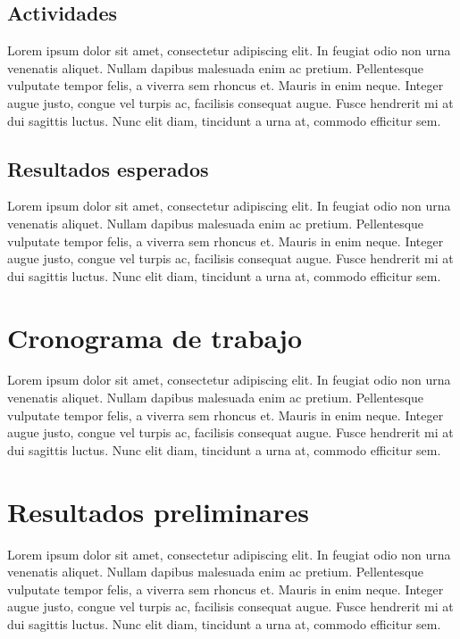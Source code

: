 \documentclass[letterpaper,twoside,10pt]{report}
\begin{document}
\section{Actividades}

Lorem ipsum dolor sit amet, consectetur adipiscing elit. In feugiat odio non urna venenatis aliquet. Nullam dapibus malesuada enim ac pretium. Pellentesque vulputate tempor felis, a viverra sem rhoncus et. Mauris in enim neque. Integer augue justo, congue vel turpis ac, facilisis consequat augue. Fusce hendrerit mi at dui sagittis luctus. Nunc elit diam, tincidunt a urna at, commodo efficitur sem.

\section{Resultados esperados}

Lorem ipsum dolor sit amet, consectetur adipiscing elit. In feugiat odio non urna venenatis aliquet. Nullam dapibus malesuada enim ac pretium. Pellentesque vulputate tempor felis, a viverra sem rhoncus et. Mauris in enim neque. Integer augue justo, congue vel turpis ac, facilisis consequat augue. Fusce hendrerit mi at dui sagittis luctus. Nunc elit diam, tincidunt a urna at, commodo efficitur sem.

\chapter{Cronograma de trabajo}\label{cronograma}

Lorem ipsum dolor sit amet, consectetur adipiscing elit. In feugiat odio non urna venenatis aliquet. Nullam dapibus malesuada enim ac pretium. Pellentesque vulputate tempor felis, a viverra sem rhoncus et. Mauris in enim neque. Integer augue justo, congue vel turpis ac, facilisis consequat augue. Fusce hendrerit mi at dui sagittis luctus. Nunc elit diam, tincidunt a urna at, commodo efficitur sem.

\chapter{Resultados preliminares}\label{resultados}

Lorem ipsum dolor sit amet, consectetur adipiscing elit. In feugiat odio non urna venenatis aliquet. Nullam dapibus malesuada enim ac pretium. Pellentesque vulputate tempor felis, a viverra sem rhoncus et. Mauris in enim neque. Integer augue justo, congue vel turpis ac, facilisis consequat augue. Fusce hendrerit mi at dui sagittis luctus. Nunc elit diam, tincidunt a urna at, commodo efficitur sem.
\end{document}
